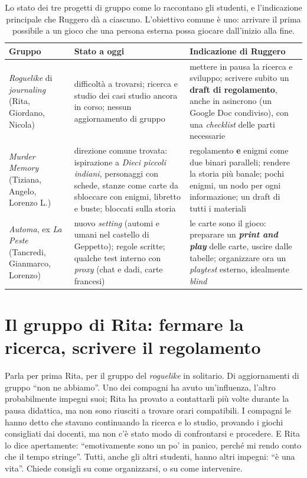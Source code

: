 \begin{table}[htbp]
\centering
\small
\begin{tabular}{@{}p{2.5cm}p{5.0cm}p{5.5cm}@{}}
\toprule
\textbf{Gruppo} & \textbf{Stato a oggi} & \textbf{Indicazione di Ruggero} \\
\midrule
\emph{Roguelike} di \emph{journaling} (Rita, Giordano, Nicola) & difficoltà a trovarsi;
ricerca e studio dei casi studio ancora in corso; nessun aggiornamento di gruppo &
mettere in pausa la ricerca e sviluppo; scrivere subito un \textbf{draft di
regolamento}, anche in asincrono (un Google Doc condiviso), con una \emph{checklist}
delle parti necessarie \\
\addlinespace
\emph{Murder Memory} (Tiziana, Angelo, Lorenzo L.) & direzione comune trovata: ispirazione
a \emph{Dieci piccoli indiani}, personaggi con schede, stanze come carte da sbloccare
con enigmi, libretto e buste; bloccati sulla storia & regolamento \textbf{e} enigmi come
due binari paralleli; rendere la storia più banale; pochi enigmi, un nodo per ogni
informazione; un draft di tutti i materiali \\
\addlinespace
\emph{Automa}, ex \emph{La Peste} (Tancredi, Gianmarco, Lorenzo) & nuovo
\emph{setting} (automi e umani nel castello di Geppetto); regole scritte; qualche test
interno con \emph{proxy} (chat e dadi, carte francesi) & le carte sono il gioco:
preparare un \textbf{\emph{print and play}} delle carte, uscire dalle tabelle;
organizzare ora un \emph{playtest} esterno, idealmente \emph{blind} \\
\bottomrule
\end{tabular}
\caption{Lo stato dei tre progetti di gruppo come lo raccontano gli studenti, e
l'indicazione principale che Ruggero dà a ciascuno. L'obiettivo comune è uno: arrivare
il prima possibile a un gioco che una persona esterna possa giocare dall'inizio alla
fine.}
\label{a12:tab:progetti}
\end{table}

\section{Il gruppo di Rita: fermare la ricerca, scrivere il regolamento}
\label{a12:sec:rita}

Parla per prima Rita, per il gruppo del \emph{roguelike} in solitario. Di aggiornamenti di
gruppo ``non ne abbiamo''. Uno dei compagni ha avuto un'influenza, l'altro probabilmente
impegni suoi; Rita ha provato a contattarli più volte durante la pausa didattica, ma non
sono riusciti a trovare orari compatibili. I compagni le hanno detto che stavano
continuando la ricerca e lo studio, provando i giochi consigliati dai docenti, ma non c'è
stato modo di confrontarsi e procedere. E Rita lo dice apertamente: ``emotivamente sono
un po' in panico, perché mi rendo conto che il tempo stringe''. Tutti, anche gli altri
studenti, hanno altri impegni: ``è una vita''. Chiede consigli su come organizzarsi, o
su come intervenire.

